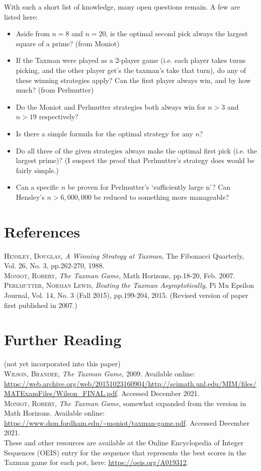 \documentclass[a4paper,10pt]{amsart} %
\begin{document}
With such a short list of knowledge, many open questions remain. A few are listed here:
\begin{itemize}
    \item Aside from $n=8$ and $n=20$, is the optimal second pick always the largest square of a prime? (from Moniot)
    \item If the Taxman were played as a 2-player game (i.e. each player takes turns picking, and the other player get's the taxman's take that turn), do any of these winning strategies apply? Can the first player always win, and by how much? (from Perlmutter)
    \item Do the Moniot and Perlmutter strategies both always win for $n > 3$ and $n > 19$ respectively? 
    \item Is there a simple formula for the optimal strategy for any $n$? 
    \item Do all three of the given strategies always make the optimal first pick (i.e. the largest prime)? (I suspect the proof that Perlmutter's strategy does would be fairly simple.)
    \item Can a specific $n$ be proven for Perlmutter's `sufficiently large n'? Can Hensley's $n > 6,000,000$ be reduced to something more manageable? 
\end{itemize}



\section{References} \label{refs}
\noindent\textsc{Hensley, Douglas,} \textit{A Winning Strategy at Taxman}, The Fibonacci Quarterly, Vol. 26, No. 3, pp.262-270, 1988.\\
\textsc{Moniot, Robert}, \textit{The Taxman Game}, Math Horizons, pp.18-20, Feb. 2007. \\
\textsc{Perlmutter, Norman Lewis}, \textit{Beating the Taxman Asymptotically}, Pi Mu Epsilon Journal, Vol. 14, No. 3 (Fall 2015), pp.199-204, 2015. (Revised version of paper first published in 2007.) 

\section{Further Reading}\label{othercites}
\noindent(not yet incorporated into this paper)\\
\textsc{Wilson, Brandee}, \textit{The Taxman Game}, 2009. Available online: \url{https://web.archive.org/web/20151023160904/http://scimath.unl.edu/MIM/files/MATExamFiles/Wilson_FINAL.pdf}. Accessed December 2021. \\
\textsc{Moniot, Robert}, \textit{The Taxman Game}, somewhat expanded from the version in Math Horizons. Available online: \url{https://www.dsm.fordham.edu/~moniot/taxman-game.pdf}. Accessed December 2021. \\
These and other resources are available at the Online Encyclopedia of Integer Sequences (OEIS) entry for the sequence that represents the best scores in the Taxman game for each pot, here: \url{https://oeis.org/A019312}. 
\end{document}
